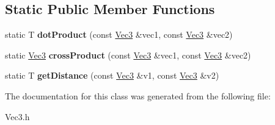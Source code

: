 \subsection*{Static Public Member Functions}
\begin{DoxyCompactItemize}
\item 
\mbox{\label{classVec3_aa34bd4ba6b5aa3abdc6186cc0cc8480a}} 
static T {\bfseries dot\+Product} (const \mbox{\hyperlink{classVec3}{Vec3}} \&vec1, const \mbox{\hyperlink{classVec3}{Vec3}} \&vec2)
\item 
\mbox{\label{classVec3_a24fbc9452cd9f123df8e08233b920068}} 
static \mbox{\hyperlink{classVec3}{Vec3}} {\bfseries cross\+Product} (const \mbox{\hyperlink{classVec3}{Vec3}} \&vec1, const \mbox{\hyperlink{classVec3}{Vec3}} \&vec2)
\item 
\mbox{\label{classVec3_a2fbe12b8c1120e803c32ab2fc826afa3}} 
static T {\bfseries get\+Distance} (const \mbox{\hyperlink{classVec3}{Vec3}} \&v1, const \mbox{\hyperlink{classVec3}{Vec3}} \&v2)
\end{DoxyCompactItemize}


The documentation for this class was generated from the following file\+:\begin{DoxyCompactItemize}
\item 
Vec3.\+h\end{DoxyCompactItemize}
